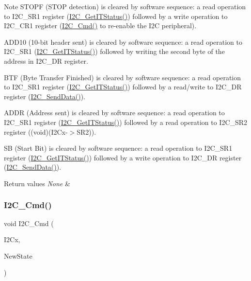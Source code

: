 \begin{DoxyNote}{Note}
S\+T\+O\+PF (S\+T\+OP detection) is cleared by software sequence\+: a read operation to I2\+C\+\_\+\+S\+R1 register (\mbox{\hyperlink{group___i2_c___group5_ga447771fbbd94a56f3570b9f430a069ba}{I2\+C\+\_\+\+Get\+I\+T\+Status()}}) followed by a write operation to I2\+C\+\_\+\+C\+R1 register (\mbox{\hyperlink{group___i2_c___group1_ga7e1323c9133c2cb424dfb5b10b7d2f0b}{I2\+C\+\_\+\+Cmd()}} to re-\/enable the I2C peripheral). 

A\+D\+D10 (10-\/bit header sent) is cleared by software sequence\+: a read operation to I2\+C\+\_\+\+S\+R1 (\mbox{\hyperlink{group___i2_c___group5_ga447771fbbd94a56f3570b9f430a069ba}{I2\+C\+\_\+\+Get\+I\+T\+Status()}}) followed by writing the second byte of the address in I2\+C\+\_\+\+DR register. 

B\+TF (Byte Transfer Finished) is cleared by software sequence\+: a read operation to I2\+C\+\_\+\+S\+R1 register (\mbox{\hyperlink{group___i2_c___group5_ga447771fbbd94a56f3570b9f430a069ba}{I2\+C\+\_\+\+Get\+I\+T\+Status()}}) followed by a read/write to I2\+C\+\_\+\+DR register (\mbox{\hyperlink{group___i2_c___group2_ga7bd9e70b8eafde0dd5eb42b0d95fe1a9}{I2\+C\+\_\+\+Send\+Data()}}). 

A\+D\+DR (Address sent) is cleared by software sequence\+: a read operation to I2\+C\+\_\+\+S\+R1 register (\mbox{\hyperlink{group___i2_c___group5_ga447771fbbd94a56f3570b9f430a069ba}{I2\+C\+\_\+\+Get\+I\+T\+Status()}}) followed by a read operation to I2\+C\+\_\+\+S\+R2 register ((void)(I2\+Cx-\/$>$S\+R2)). 

SB (Start Bit) is cleared by software sequence\+: a read operation to I2\+C\+\_\+\+S\+R1 register (\mbox{\hyperlink{group___i2_c___group5_ga447771fbbd94a56f3570b9f430a069ba}{I2\+C\+\_\+\+Get\+I\+T\+Status()}}) followed by a write operation to I2\+C\+\_\+\+DR register (\mbox{\hyperlink{group___i2_c___group2_ga7bd9e70b8eafde0dd5eb42b0d95fe1a9}{I2\+C\+\_\+\+Send\+Data()}}). 
\end{DoxyNote}

\begin{DoxyRetVals}{Return values}
{\em None} & \\
\hline
\end{DoxyRetVals}
\mbox{\label{group___i2_c_ga7e1323c9133c2cb424dfb5b10b7d2f0b}} 
\subsubsection{\texorpdfstring{I2\+C\+\_\+\+Cmd()}{I2C\_Cmd()}}
{\footnotesize\ttfamily void I2\+C\+\_\+\+Cmd (\begin{DoxyParamCaption}\item[{I2\+C\+\_\+\+Type\+Def $\ast$}]{I2\+Cx,  }\item[{Functional\+State}]{New\+State }\end{DoxyParamCaption})}



